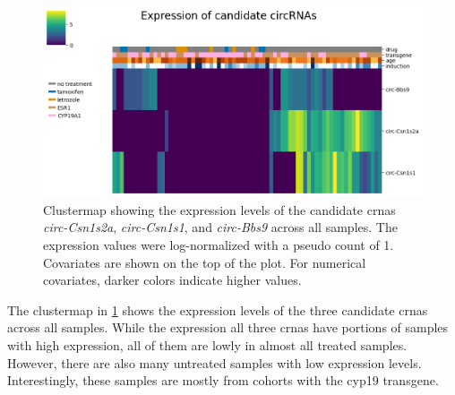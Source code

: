 \begin{figure}[H] \centering

    \includegraphics[width=\textwidth]{chapters/4_results_and_discussion/figures/heatmap.png}
    \caption{Clustermap showing the expression levels of the candidate
        \glspl{crna} \textit{circ-Csn1s2a}, \textit{circ-Csn1s1}, and
        \textit{circ-Bbs9} across all samples.
        The expression values were log-normalized with a pseudo count of 1.
        Covariates are shown on the top of the plot.
        For numerical covariates, darker colors indicate higher values.
    }
    \label{fig:candidate_heatmap}
\end{figure}

The clustermap in \cref{fig:candidate_heatmap} shows the expression levels of
the three candidate \glspl{crna} across all samples.
While the expression all three \glspl{crna} have portions of samples with high
expression, all of them are lowly in almost all treated samples.
However, there are also many untreated samples with low expression levels.
Interestingly, these samples are mostly from cohorts with the \gls{cyp19}
transgene.
